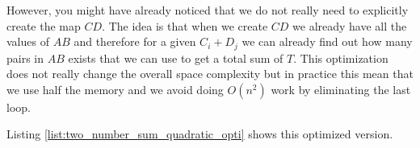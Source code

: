 However, you might have already noticed that we do not really need to explicitly create the map $CD$. 
The idea is that when we create $CD$ we already have all the values of $AB$  and therefore for a given $C_i+D_j$ we can already find out how many pairs in $AB$ exists that we can use to get a total sum of $T$. 
This optimization does not really change the overall space complexity
but in practice this mean that we use half the memory and we avoid doing $O(n^2)$ work by eliminating the last loop.

Listing \ref{list:two_number_sum_quadratic_opti} shows this optimized version.



